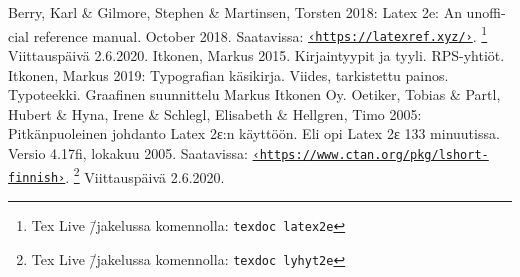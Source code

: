 \documentclass{book}
\newcommand{\angleurl}[1]{\href{#1}{\nolinkurl{‹#1›}}}
\newenvironment{teosluettelo}%
{\begin{thebibliography}{99}}%
  {\end{thebibliography}}
\newcommand{\koodi}[1]{\texttt{#1}}
\begin{document}
\begin{teosluettelo}
 Berry, Karl \& Gilmore, Stephen \&
  Martinsen, Torsten 2018: \textenglish{Latex 2e: An unofficial
    reference manual. October 2018.} Saatavissa:
  \angleurl{https://latexref.xyz/}.%
  \footnote{Tex Live \=/jakelussa komennolla: \koodi{texdoc latex2e}}
  Viittauspäivä 2.6.2020.
 Itkonen, Markus 2015. Kirjaintyypit
  ja tyyli. RPS-yhtiöt.
 Itkonen, Markus 2019: Typografian
  käsikirja. Viides, tarkistettu painos. Typoteekki. Graafinen
  suunnittelu Markus Itkonen Oy.
 Oetiker, Tobias \& Partl,
  Hubert \& Hyna, Irene \& Schlegl, Elisabeth \& Hell\-gren, Timo 2005:
  Pitkänpuoleinen johdanto Latex 2ε:n käyttöön. Eli opi Latex 2ε 133
  minuutissa. Versio 4.17fi, lokakuu 2005. Saatavissa:
  \angleurl{https://www.ctan.org/pkg/lshort-finnish}.%
  \footnote{Tex Live \=/jakelussa komennolla: \koodi{texdoc lyhyt2e}}
  Viittauspäivä 2.6.2020.
\end{teosluettelo}

\printindex
\end{document}
